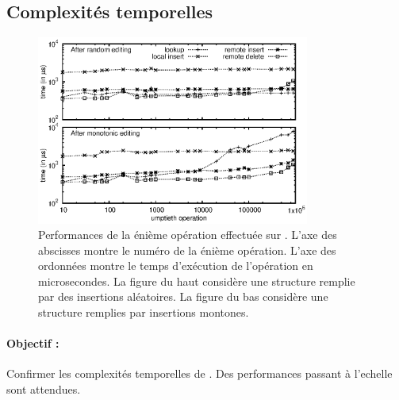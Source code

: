 \subsection{Complexités temporelles}

\begin{figure}
  \begin{center}
    \includegraphics[width=0.8\textwidth]{img/lseq/time.eps}
    \caption{\label{repl:img:time} Performances de la énième opération effectuée
      sur \LSEQ. L'axe des abscisses montre le numéro de la énième
      opération. L'axe des ordonnées montre le temps d'exécution de l'opération
      en microsecondes. La figure du haut considère une structure remplie par
      des insertions aléatoires. La figure du bas considère une structure
      remplies par insertions montones.}
  \end{center}
\end{figure}

\paragraph{Objectif :} Confirmer les complexités temporelles de \LSEQ. Des
performances passant à l'echelle sont attendues.

